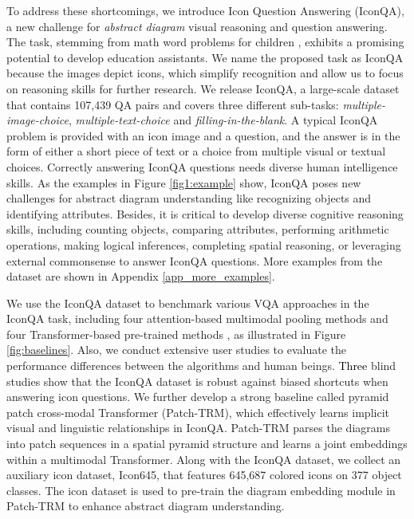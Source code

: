 \documentclass{article}
\begin{document}
To address these shortcomings, we introduce Icon Question Answering (IconQA), a new challenge for \textit{abstract diagram} visual reasoning and question answering. The task, stemming from math word problems for children \cite{martiniello2008language}, exhibits a promising potential to develop education assistants. We name the proposed task as IconQA because the images depict icons, which simplify recognition and allow us to focus on reasoning skills for further research. We release IconQA, a large-scale dataset that contains 107,439 QA pairs and covers three different sub-tasks: \textit{multiple-image-choice}, \textit{multiple-text-choice} and \textit{filling-in-the-blank}. A typical IconQA problem is provided with an icon image and a question, and the answer is in the form of either a short piece of text or a choice from multiple visual or textual choices. Correctly answering IconQA questions needs diverse human intelligence skills. As the examples in Figure \ref{fig1:example} show, IconQA poses new challenges for abstract diagram understanding like recognizing objects and identifying attributes. Besides, it is critical to develop diverse cognitive reasoning skills, including counting objects, comparing attributes, performing arithmetic operations, making logical inferences, completing spatial reasoning, or leveraging external commonsense to answer IconQA questions. More examples from the dataset are shown in Appendix \ref{app_more_examples}.



We use the IconQA dataset to benchmark various VQA approaches in the IconQA task, including four attention-based multimodal pooling methods \cite{Anderson2017up, Kim2018, yu2019mcan, gao2019dynamic} and four Transformer-based pre-trained methods \cite{li2019visualbert, chen2020uniter,wonjae2021an,pmlr-v139-kim21k}, as illustrated in Figure \ref{fig:baselines}. Also, we conduct extensive user studies to evaluate the performance differences between the algorithms and human beings. \textcolor{black}{Three} blind studies show that the IconQA dataset is robust against biased shortcuts when answering icon questions. We further develop a strong baseline called pyramid patch cross-modal Transformer (Patch-TRM), which effectively learns implicit visual and linguistic relationships in IconQA. Patch-TRM parses the diagrams into patch sequences in a spatial pyramid structure and learns a joint embeddings within a multimodal Transformer. Along with the IconQA dataset, we collect an auxiliary icon dataset, Icon645, that features 645,687 colored icons on 377 object classes. The icon dataset is used to pre-train the diagram embedding module in Patch-TRM to enhance abstract diagram understanding. 
\end{document}
